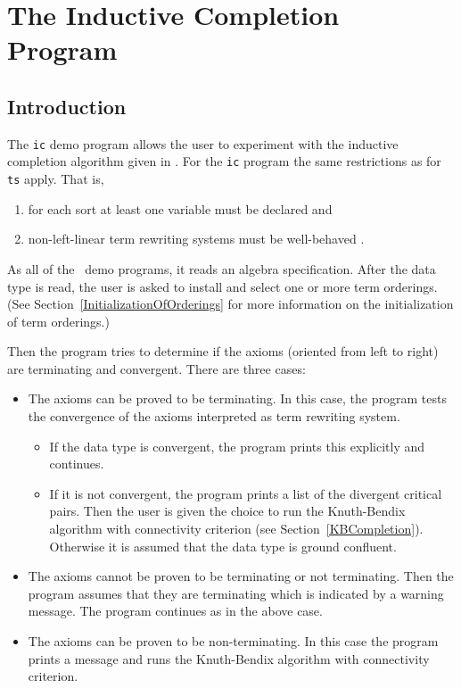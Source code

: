 \section{The Inductive Completion Program}
\subsection{Introduction}
The {\tt ic} demo program allows the user to experiment with the
inductive completion algorithm given in \cite{Buendgen:87}.
For the {\tt ic} program the same restrictions as for {\tt ts}
apply. That is,
\begin{enumerate}
\item
for each sort at least one variable must be declared and
\item
non-left-linear term rewriting systems must be well-behaved
\cite{BuendgenEckhardt:92}.
\end{enumerate}
As all of the \redux\  demo programs, it reads an algebra specification.
After the data type is read, the user is asked to install and select
one or more term orderings.
(See Section~\ref{InitializationOfOrderings} for more information on the
initialization of term orderings.)

Then the program tries to determine if the axioms (oriented from 
left to right) are terminating and convergent. There are three cases:

\begin{itemize}
\item The axioms can be proved to be terminating. In this case,
the program tests the convergence of the axioms interpreted as term 
rewriting system.

\begin{itemize}
\item 
If the data type is convergent, the program prints this explicitly and
continues. 

\item If it is not convergent, the program 
prints a list of the divergent critical pairs.
Then the user is given the choice to run the Knuth-Bendix algorithm with
connectivity criterion (see Section~\ref{KBCompletion}).
Otherwise it is assumed that the data type is ground confluent.
\end{itemize}

\item The axioms cannot be proven to be terminating or not terminating. 
Then the  program assumes that they are terminating which is indicated
by a warning message. The program continues as in the above case.

\item The axioms can be proven to be non-terminating.
In this case the program prints a message and runs the Knuth-Bendix 
algorithm with connectivity criterion.
\end{itemize}

